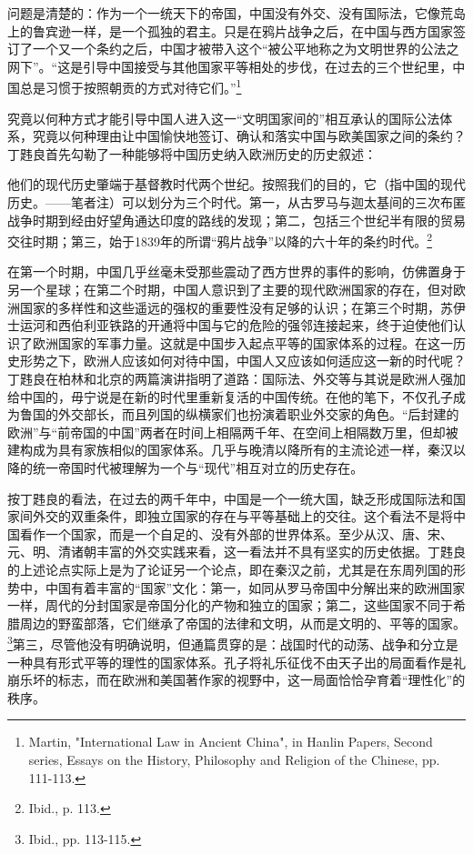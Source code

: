 \documentclass[a4paper, 12pt, openright]{ctexbook}
\renewenvironment{quote}
  {\list{}{\rightmargin2\ccwd \leftmargin2\ccwd \itemindent=2\ccwd \listparindent=2\ccwd}%
   \item\relax\small\kaishu\color{black}}
  {\endlist}
\begin{document}
问题是清楚的：作为一个一统天下的帝国，中国没有外交、没有国际法，它像荒岛上的鲁宾逊一样，是一个孤独的君主。只是在鸦片战争之后，在中国与西方国家签订了一个又一个条约之后，中国才被带入这个“被公平地称之为文明世界的公法之网下”。“这是引导中国接受与其他国家平等相处的步伐，在过去的三个世纪里，中国总是习惯于按照朝贡的方式对待它们。”\footnote{Martin, "International Law in Ancient China", in Hanlin Papers, Second series, Essays on the History, Philosophy and Religion of the Chinese, pp. 111-113.}

究竟以何种方式才能引导中国人进入这一“文明国家间的”相互承认的国际公法体系，究竟以何种理由让中国愉快地签订、确认和落实中国与欧美国家之间的条约？丁韪良首先勾勒了一种能够将中国历史纳入欧洲历史的历史叙述：

\begin{quote}
他们的现代历史肇端于基督教时代两个世纪。按照我们的目的，它（指中国的现代历史。——笔者注）可以划分为三个时代。第一，从古罗马与迦太基间的三次布匿战争时期到经由好望角通达印度的路线的发现；第二，包括三个世纪半有限的贸易交往时期；第三，始于1839年的所谓“鸦片战争”以降的六十年的条约时代。\footnote{Ibid., p. 113.}
\end{quote}

在第一个时期，中国几乎丝毫未受那些震动了西方世界的事件的影响，仿佛置身于另一个星球；在第二个时期，中国人意识到了主要的现代欧洲国家的存在，但对欧洲国家的多样性和这些遥远的强权的重要性没有足够的认识；在第三个时期，苏伊士运河和西伯利亚铁路的开通将中国与它的危险的强邻连接起来，终于迫使他们认识了欧洲国家的军事力量。这就是中国步入起点平等的国家体系的过程。在这一历史形势之下，欧洲人应该如何对待中国，中国人又应该如何适应这一新的时代呢？丁韪良在柏林和北京的两篇演讲指明了道路：国际法、外交等与其说是欧洲人强加给中国的，毋宁说是在新的时代里重新复活的中国传统。在他的笔下，不仅孔子成为鲁国的外交部长，而且列国的纵横家们也扮演着职业外交家的角色。“后封建的欧洲”与“前帝国的中国”两者在时间上相隔两千年、在空间上相隔数万里，但却被建构成为具有家族相似的国家体系。几乎与晚清以降所有的主流论述一样，秦汉以降的统一帝国时代被理解为一个与“现代”相互对立的历史存在。

按丁韪良的看法，在过去的两千年中，中国是一个一统大国，缺乏形成国际法和国家间外交的双重条件，即独立国家的存在与平等基础上的交往。这个看法不是将中国看作一个国家，而是一个自足的、没有外部的世界体系。至少从汉、唐、宋、元、明、清诸朝丰富的外交实践来看，这一看法并不具有坚实的历史依据。丁韪良的上述论点实际上是为了论证另一个论点，即在秦汉之前，尤其是在东周列国的形势中，中国有着丰富的“国家”文化：第一，如同从罗马帝国中分解出来的欧洲国家一样，周代的分封国家是帝国分化的产物和独立的国家；第二，这些国家不同于希腊周边的野蛮部落，它们继承了帝国的法律和文明，从而是文明的、平等的国家。\footnote{Ibid., pp. 113-115.}第三，尽管他没有明确说明，但通篇贯穿的是：战国时代的动荡、战争和分立是一种具有形式平等的理性的国家体系。孔子将礼乐征伐不由天子出的局面看作是礼崩乐坏的标志，而在欧洲和美国著作家的视野中，这一局面恰恰孕育着“理性化”的秩序。
\end{document}
